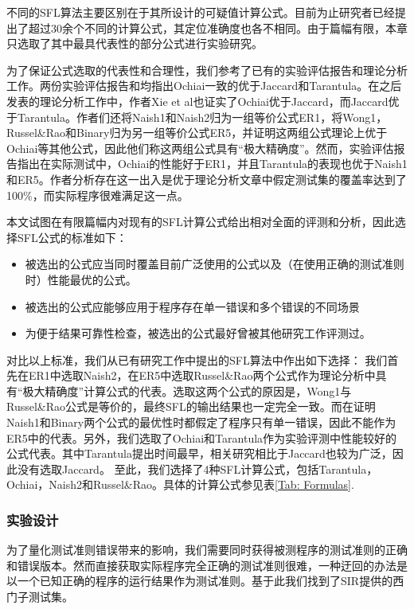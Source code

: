 不同的SFL算法主要区别在于其所设计的可疑值计算公式。目前为止研究者已经提出了超过30余个不同的计算公式，其定位准确度也各不相同。由于篇幅有限，本章只选取了其中最具代表性的部分公式进行实验研究。

为了保证公式选取的代表性和合理性，我们参考了已有的实验评估报告和理论分析工作。两份实验评估报告\cite{Yu:2008:ESE:1368088.1368116}和\cite{Abreu20091780}均指出Ochiai一致的优于Jaccard和Tarantula。在之后发表的理论分析工作\cite{xie2013theoretical}中，作者Xie et al也证实了Ochiai优于Jaccard，而Jaccard优于Tarantula。作者们还将Naish1和Naish2归为一组等价公式ER1，将Wong1，Russel\&Rao和Binary归为另一组等价公式ER5，并证明这两组公式理论上优于Ochiai等其他公式，因此他们称这两组公式具有“极大精确度”。然而，实验评估报告\cite{6676912}指出在实际测试中，Ochiai的性能好于ER1，并且Tarantula的表现也优于Naish1和ER5。作者分析存在这一出入是优于理论分析文章\cite{xie2013theoretical}中假定测试集的覆盖率达到了100\%，而实际程序很难满足这一点。

本文试图在有限篇幅内对现有的SFL计算公式给出相对全面的评测和分析，因此选择SFL公式的标准如下：
\begin{itemize}
\item 被选出的公式应当同时覆盖目前广泛使用的公式以及（在使用正确的测试准则时）性能最优的公式。
\item 被选出的公式应能够应用于程序存在单一错误和多个错误的不同场景
\item 为便于结果可靠性检查，被选出的公式最好曾被其他研究工作评测过。
\end{itemize}
对比以上标准，我们从已有研究工作中提出的SFL算法中作出如下选择：
我们首先在ER1中选取Naish2，在ER5中选取Russel\&Rao两个公式作为理论分析中具有“极大精确度”计算公式的代表。选取这两个公式的原因是，Wong1与Russel\&Rao公式是等价的，最终SFL的输出结果也一定完全一致。而在证明Naish1和Binary两个公式的最优性时都假定了程序只有单一错误，因此不能作为ER5中的代表。另外，我们选取了Ochiai和Tarantula作为实验评测中性能较好的公式代表。其中Tarantula提出时间最早，相关研究相比于Jaccard也较为广泛，因此没有选取Jaccard。
至此，我们选择了4种SFL计算公式，包括Tarantula，Ochiai，Naish2和Russel\&Rao。具体的计算公式参见表\ref{Tab: Formulas}.

\subsubsection{实验设计}\label{subsection data collection}

为了量化测试准则错误带来的影响，我们需要同时获得被测程序的测试准则的正确和错误版本。然而直接获取实际程序完全正确的测试准则很难，一种迂回的办法是以一个已知正确的程序的运行结果作为测试准则。基于此我们找到了SIR提供的西门子测试集。

